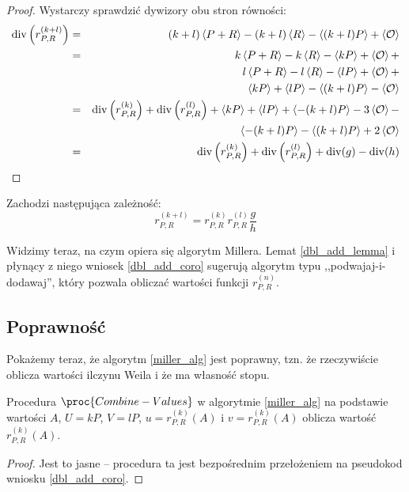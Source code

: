\begin{proof}
Wystarczy sprawdzić dywizory obu stron równości:
\begin{eqnarray*}
\operatorname{div}\left(r_{P,R}^{(k+l)}\right)
& = & (k+l)\left\langle P+R\right\rangle - (k+l)\left\langle R\right\rangle - \left\langle(k+l)P\right\rangle + \left\langle\mathcal{O}\right\rangle \\
& = & k\left\langle P+R\right\rangle - k\left\langle R\right\rangle - \left\langle kP\right\rangle + \left\langle\mathcal{O}\right\rangle + \\
&   & l\left\langle P+R\right\rangle - l\left\langle R\right\rangle - \left\langle lP\right\rangle + \left\langle\mathcal{O}\right\rangle + \\
&   & \left\langle kP\right\rangle + \left\langle lP\right\rangle - \left\langle(k+l)P\right\rangle - \left\langle\mathcal{O}\right\rangle \\
& = & \operatorname{div}\left(r_{P,R}^{(k)}\right) + \operatorname{div}\left(r_{P,R}^{(l)}\right) +
      \left\langle kP\right\rangle + \left\langle lP\right\rangle + \left\langle-(k+l)P\right\rangle - 3\left\langle\mathcal{O}\right\rangle - \\
&   & \left\langle-(k+l)P\right\rangle - \left\langle(k+l)P\right\rangle + 2\left\langle\mathcal{O}\right\rangle \\
& = & \operatorname{div}\left(r_{P,R}^{(k)}\right) + \operatorname{div}\left(r_{P,R}^{(l)}\right) +
      \operatorname{div}(g) - \operatorname{div}(h)
\end{eqnarray*}
\end{proof}

\begin{corollary}\label{dbl_add_coro}
Zachodzi następująca zależność:
\begin{equation}
r_{P,R}^{(k+l)} = r_{P,R}^{(k)} r_{P,R}^{(l)} \frac{g}{h}
\end{equation}
\end{corollary}

\noindent
Widzimy teraz, na czym opiera się algorytm Millera.
Lemat \ref{dbl_add_lemma} i płynący z niego wniosek \ref{dbl_add_coro}
sugerują algorytm typu ,,podwajaj-i-dodawaj'',
który pozwala obliczać wartości funkcji $r_{P,R}^{(n)}$.

\subsection*{Poprawność}

\noindent
Pokażemy teraz, że algorytm \ref{miller_alg} jest poprawny,
tzn. że rzeczywiście oblicza wartości ilczynu Weila
i że ma własność stopu.

\begin{lemma}
Procedura $\proc{Combine-Values}$ w algorytmie \ref{miller_alg}
na podstawie wartości
$A$, $U = kP$, $V = lP$, $u = r_{P,R}^{(k)}(A)$ i $v = r_{P,R}^{(k)}(A)$
oblicza
wartość $r_{P,R}^{(k)}(A)$.
\end{lemma}

\begin{proof}
Jest to jasne -- procedura ta jest bezpośrednim przełożeniem na pseudokod
wniosku \ref{dbl_add_coro}.
\end{proof}

